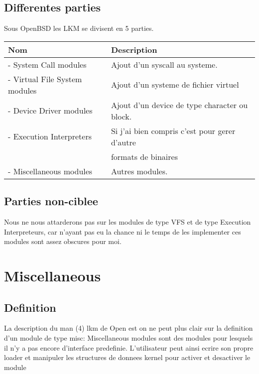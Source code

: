 \documentclass[a4paper, 11pt]{article}
\begin{document}
\subsection{Differentes parties}
Sous OpenBSD les LKM se divisent en 5 parties.
\begin{center}
\begin{tabular}{|l|l|}
\hline
Nom & Description \\
\hline
- System Call modules & Ajout d'un syscall au systeme.\\
- Virtual File System modules &  Ajout d'un systeme de fichier virtuel\\
- Device Driver modules & Ajout d'un device de type character ou block.\\
- Execution Interpreters & Si j'ai bien compris c'est pour gerer d'autre\\&  formats de binaires\\
- Miscellaneous modules & Autres modules.\\
\hline
\end{tabular}
\end{center}

\subsection{Parties non-ciblee}
Nous ne nous attarderons pas sur les modules de type VFS et de type Execution
Interpreteurs, car n'ayant pas eu la chance ni le temps de les implementer
ces modules sont assez obscures pour moi.
\newpage
\section{Miscellaneous}
\subsection{Definition}
La description du man (4) lkm de Open est on ne peut plus clair sur la
definition d'un module de type misc: Miscellaneous modules sont des modules
pour lesquels il n'y a pas encore d'interface predefinie. L'utilisateur
peut ainsi ecrire son propre loader et manipuler les structures de donnees kernel
pour activer et desactiver le module
\end{document}
